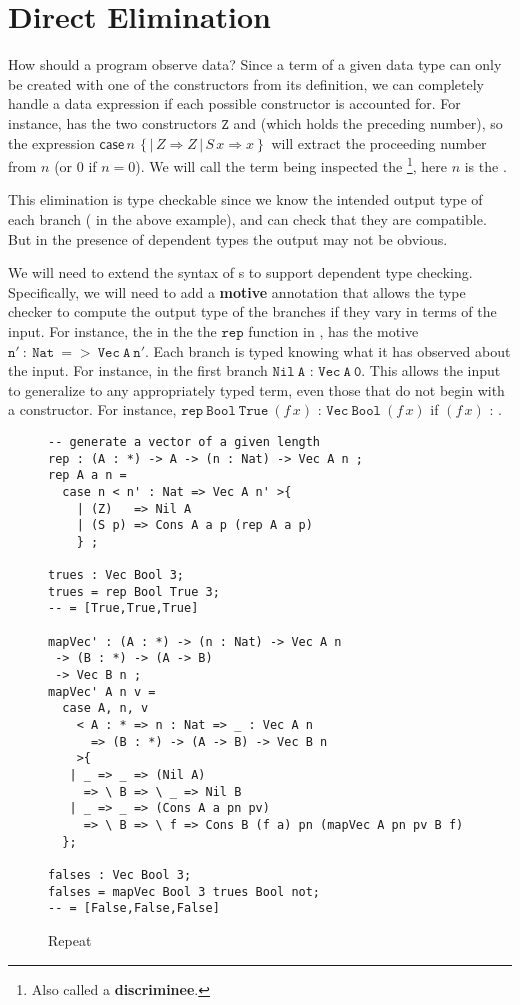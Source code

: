 \section{Direct Elimination}

How should a program observe data?
Since a term of a given data type can only be created with one of the constructors from its definition, we can completely handle a data expression if each possible constructor is accounted for.
For instance, \Nat{} has the two constructors $\mathtt{Z}$ and \Suc (which holds the preceding number), so the expression $\mathsf{case}\,n\,\left\{ |\,Z\Rightarrow Z\,|\,S\,x\Rightarrow x\right\}$ will extract the proceeding number from $n$ (or $0$ if $n=0$).
We will call the term being inspected the \textbf{\scrut{}}\footnote{
  Also called a \textbf{discriminee}.
}, here $n$ is the \scrut{}.
 
This \Nat{} elimination is type checkable since we know the intended output type of each branch (\Nat{} in the above example), and can check that they are compatible.
But in the presence of dependent types the output may not be obvious.

We will need to extend the syntax of \case{}s to support dependent type checking.
Specifically, we will need to add a \textbf{motive} annotation that allows the type checker to compute the output type of the branches if they vary in terms of the input.
For instance, the \case{} in the the $\mathtt{rep}$ function in , has the motive $\mathtt{n'\ :\ Nat\ =>\ Vec\ A\ n'}$.
Each branch is typed knowing what it has observed about the input.
For instance, in the first branch $\mathtt{Nil\ A}$ :  $\mathtt{Vec\ A\ 0}$.
This allows the input to generalize to any appropriately typed term, even those that do not begin with a constructor.
For instance, $\mathtt{rep\ Bool\ True\ }(f\,x)$ : $\mathtt{Vec\ Bool\ }(f\,x)$ if $(f\,x)$ : \Nat{}.

\begin{figure}
\begin{lstlisting}[basicstyle={\ttfamily\small}]
-- generate a vector of a given length
rep : (A : *) -> A -> (n : Nat) -> Vec A n ;
rep A a n = 
  case n < n' : Nat => Vec A n' >{
    | (Z)   => Nil A
    | (S p) => Cons A a p (rep A a p)
    } ;

trues : Vec Bool 3;
trues = rep Bool True 3;
-- = [True,True,True]

mapVec' : (A : *) -> (n : Nat) -> Vec A n 
 -> (B : *) -> (A -> B)
 -> Vec B n ;
mapVec' A n v =
  case A, n, v 
    < A : * => n : Nat => _ : Vec A n 
      => (B : *) -> (A -> B) -> Vec B n 
    >{
   | _ => _ => (Nil A)          
     => \ B => \ _ => Nil B
   | _ => _ => (Cons A a pn pv) 
     => \ B => \ f => Cons B (f a) pn (mapVec A pn pv B f)
  };

falses : Vec Bool 3;
falses = mapVec Bool 3 trues Bool not;
-- = [False,False,False]
\end{lstlisting}
\caption{Repeat}
\label{fig:data-elim-examples}
\end{figure}

